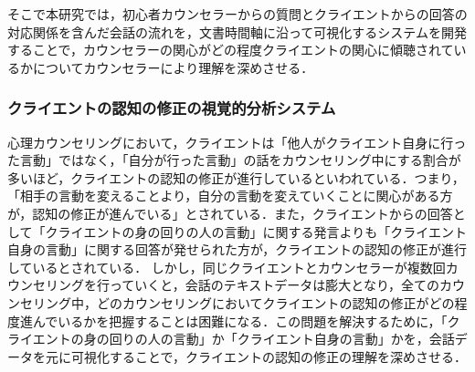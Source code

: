 \documentclass[shuuron]{kuee}
\begin{document}
そこで本研究では，初心者カウンセラーからの質問とクライエントからの回答の対応関係を含んだ会話の流れを，文書時間軸に沿って可視化するシステムを開発することで，カウンセラーの関心がどの程度クライエントの関心に傾聴されているかについてカウンセラーにより理解を深めさせる．






\subsubsection{クライエントの認知の修正の視覚的分析システム}


心理カウンセリングにおいて，クライエントは「他人がクライエント自身に行った言動」ではなく，「自分が行った言動」の話をカウンセリング中にする割合が多いほど，クライエントの認知の修正が進行しているといわれている．つまり，「相手の言動を変えることより，自分の言動を変えていくことに関心がある方が，認知の修正が進んでいる」\cite{zokad}とされている．また，クライエントからの回答として「クライエントの身の回りの人の言動」に関する発言よりも「クライエント自身の言動」に関する回答が発せられた方が，クライエントの認知の修正が進行しているとされている．
しかし，同じクライエントとカウンセラーが複数回カウンセリングを行っていくと，会話のテキストデータは膨大となり，全てのカウンセリング中，どのカウンセリングにおいてクライエントの認知の修正がどの程度進んでいるかを把握することは困難になる．この問題を解決するために，「クライエントの身の回りの人の言動」か「クライエント自身の言動」かを，会話データを元に可視化することで，クライエントの認知の修正の理解を深めさせる．
\end{document}
